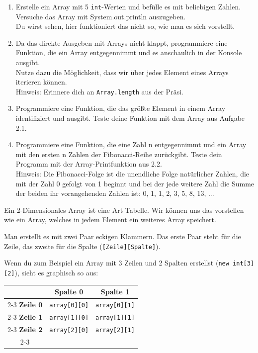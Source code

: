 \documentclass{../../sheet}
\begin{document}
\begin{enumerate}
    \item Erstelle ein Array mit 5 \texttt{int}-Werten und befülle es mit beliebigen Zahlen. Versuche das Array mit System.out.println auszugeben. \\ Du wirst sehen, hier funktioniert das nicht so, wie man es sich vorstellt.
    \item Da das direkte Ausgeben mit Arrays nicht klappt, programmiere eine Funktion, die ein Array entgegennimmt und es anschaulich in der Konsole ausgibt.\\
        Nutze dazu die Möglichkeit, dass wir über jedes Element eines Arrays iterieren können.\\
        Hinweis: Erinnere dich an \texttt{Array.length} aus der Präsi.
    \item Programmiere eine Funktion, die das größte Element in einem Array identifiziert und ausgibt. Teste deine Funktion mit dem Array aus Aufgabe 2.1.
    \item Programmiere eine Funktion, die eine Zahl n entgegennimmt und ein Array mit den ersten n Zahlen der Fibonacci-Reihe zurückgibt. Teste dein Programm mit der Array-Printfunktion aus 2.2.\\
          Hinweis: Die Fibonacci-Folge ist die unendliche Folge natürlicher Zahlen, die mit der Zahl 0 gefolgt von 1 beginnt und bei der jede weitere Zahl die Summe der beiden ihr vorangehenden Zahlen ist: 0, 1, 1, 2, 3, 5, 8, 13, ...
\end{enumerate}

\newpage
{}
Ein 2-Dimensionales Array ist eine Art Tabelle. Wir können uns das vorstellen wie ein Array, welches in jedem Element ein weiteres Array speichert.

Man erstellt es mit zwei Paar eckigen Klammern. Das erste Paar steht für die Zeile, das zweite für die Spalte (\texttt{[Zeile][Spalte]}).

Wenn du zum Beispiel ein Array mit 3 Zeilen und 2 Spalten erstellst (\texttt{new int[3][2]}), sieht es graphisch so aus:

\begin{center}
\renewcommand{\arraystretch}{1.5} %
\begin{tabular}{c | c | c |}
\multicolumn{1}{c}{} & \multicolumn{1}{c}{\textbf{Spalte 0}} & \multicolumn{1}{c}{\textbf{Spalte 1}} \\ \cline{2-3}
\textbf{Zeile 0} & \texttt{array[0][0]} & \texttt{array[0][1]} \\ \cline{2-3}
\textbf{Zeile 1} & \texttt{array[1][0]} & \texttt{array[1][1]} \\ \cline{2-3}
\textbf{Zeile 2} & \texttt{array[2][0]} & \texttt{array[2][1]} \\ \cline{2-3}
\end{tabular}
\end{center}
\end{document}
